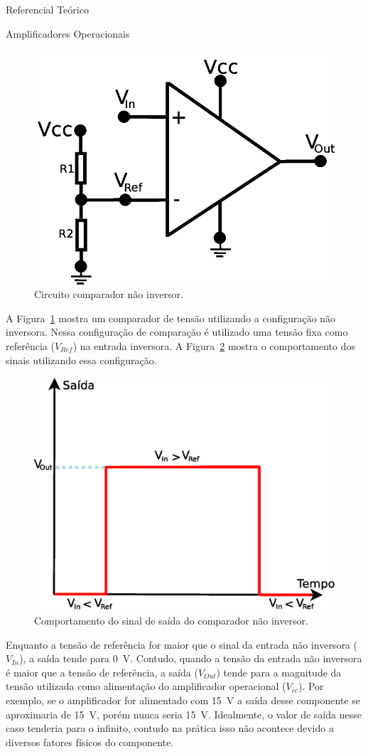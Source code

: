 \begin{chapter}{Referencial Teórico}
\begin{section}{Amplificadores Operacionais}
\begin{figure}[!h]
	\centering
	\begin{minipage}[c]{\textwidth}
	\centering
	\includegraphics[width=0.6\linewidth]{fig/nao_inversor}
	\caption{Circuito comparador não inversor.}
	\label{fig:comparador1}
	\end{minipage}
\end{figure}

A Figura~\ref{fig:comparador1} mostra um comparador de tensão utilizando a
configuração não inversora. Nessa configuração de comparação é utilizado uma
tensão fixa como referência ($V_{Ref}$) na entrada inversora. A
Figura~\ref{fig:sinal1} mostra o comportamento dos sinais utilizando essa
configuração.

\begin{figure}[!h]
	\centering
	\begin{minipage}[c]{\textwidth}
	\centering
	\includegraphics[width=0.5\linewidth]{fig/comparador_nao_inversor}
	\caption{Comportamento do sinal de saída do comparador não inversor.}
	\label{fig:sinal1}
	\end{minipage}
\end{figure}

Enquanto a tensão de referência for maior que o sinal da entrada não inversora
($V_{In}$), a saída tende para 0~V. Contudo, quando a tensão da entrada não
inversora é maior que a tensão de referência, a saída ($V_{Out}$) tende para a
magnitude da tensão utilizada como alimentação do amplificador operacional
($V_{cc}$). Por
exemplo, se o amplificador for alimentado com 15~V a saída desse componente se
aproximaria de 15~V, porém nunca seria 15~V. Idealmente, o valor de saída nesse
caso tenderia para o infinito, contudo na prática isso não acontece devido a
diversos fatores físicos do componente.


\end{section}
\end{chapter}
